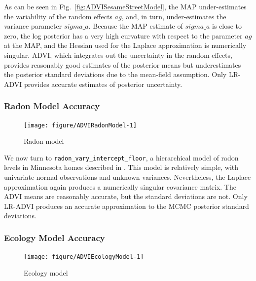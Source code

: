 \documentclass{article}\usepackage[]{graphicx}\usepackage[]{color}
\newenvironment{knitrout}{}{}
\theoremstyle{definition}
\theoremstyle{plain}
\theoremstyle{plain}
\theoremstyle{plain}
\theoremstyle{definition}
\theoremstyle{plain}
\theoremstyle{plain}
\newcommand{\fig}[1]{Fig.~\ref{fig:#1}}
\begin{document}
As can be seen in \fig{ADVISesameStreetModel}, the MAP under-estimates the
variability of the random effects $ag$, and, in turn, under-estimates the
variance parameter $sigma\_a$. Because the MAP estimate of $sigma\_a$ is close
to zero, the log posterior has a very high curvature with respect to the
parameter $ag$ at the MAP, and the Hessian used for the Laplace approximation is
numerically singular. ADVI, which integrates out the uncertainty in the random
effects, provides reasonably good estimates of the posterior means but
underestimates the posterior standard deviations due to the mean-field
assumption.  Only LR-ADVI provides accurate estimates of posterior uncertainty.

\subsubsection{Radon Model Accuracy}

\begin{knitrout}
\color{fgcolor}\begin{figure}[t]

{\centering \texttt{[image: figure/ADVIRadonModel-1]} 

}

\caption[Radon model]{Radon model}\label{fig:ADVIRadonModel}
\end{figure}


\end{knitrout}

We now turn to \texttt{radon\_vary\_intercept\_floor}, a hierarchical model of
radon levels in Minnesota homes described in
\citet[Chapters 16 and 21]{gelman:2006:arm}.
This model is relatively simple, with univariate normal
observations and unknown variances. Nevertheless, the Laplace approximation
again produces a numerically singular covariance matrix.
The ADVI means are reasonably
accurate, but the standard deviations are not. Only LR-ADVI produces an
accurate approximation to the MCMC posterior standard deviations.

\subsubsection{Ecology Model Accuracy}

\begin{knitrout}
\color{fgcolor}\begin{figure}[t]

{\centering \texttt{[image: figure/ADVIEcologyModel-1]} 

}

\caption[Ecology model]{Ecology model}\label{fig:ADVIEcologyModel}
\end{figure}


\end{knitrout}
\end{document}
